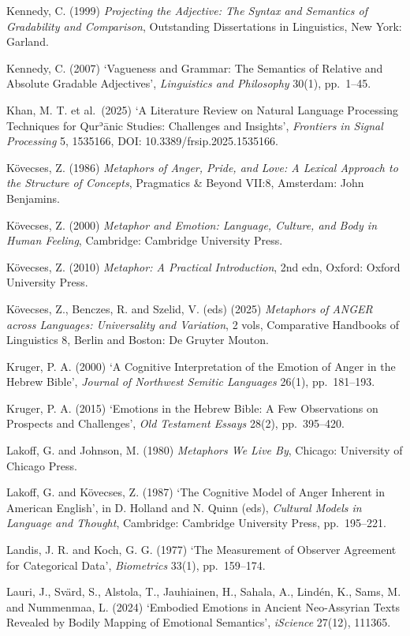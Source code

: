 Kennedy, C. (1999) \emph{Projecting the Adjective: The Syntax and
Semantics of Gradability and Comparison}, Outstanding Dissertations in
Linguistics, New York: Garland.

Kennedy, C. (2007) `Vagueness and Grammar: The Semantics of Relative and
Absolute Gradable Adjectives', \emph{Linguistics and Philosophy} 30(1),
pp.~1--45.

Khan, M. T. et al.~(2025) `A Literature Review on Natural Language
Processing Techniques for Qurʾānic Studies: Challenges and Insights',
\emph{Frontiers in Signal Processing} 5, 1535166, DOI:
10.3389/frsip.2025.1535166.

Kövecses, Z. (1986) \emph{Metaphors of Anger, Pride, and Love: A Lexical
Approach to the Structure of Concepts}, Pragmatics \& Beyond VII:8,
Amsterdam: John Benjamins.

Kövecses, Z. (2000) \emph{Metaphor and Emotion: Language, Culture, and
Body in Human Feeling}, Cambridge: Cambridge University Press.

Kövecses, Z. (2010) \emph{Metaphor: A Practical Introduction}, 2nd edn,
Oxford: Oxford University Press.

Kövecses, Z., Benczes, R. and Szelid, V. (eds) (2025) \emph{Metaphors of
ANGER across Languages: Universality and Variation}, 2 vols, Comparative
Handbooks of Linguistics 8, Berlin and Boston: De Gruyter Mouton.

Kruger, P. A. (2000) `A Cognitive Interpretation of the Emotion of Anger
in the Hebrew Bible', \emph{Journal of Northwest Semitic Languages}
26(1), pp.~181--193.

Kruger, P. A. (2015) `Emotions in the Hebrew Bible: A Few Observations
on Prospects and Challenges', \emph{Old Testament Essays} 28(2),
pp.~395--420.

Lakoff, G. and Johnson, M. (1980) \emph{Metaphors We Live By}, Chicago:
University of Chicago Press.

Lakoff, G. and Kövecses, Z. (1987) `The Cognitive Model of Anger
Inherent in American English', in D. Holland and N. Quinn (eds),
\emph{Cultural Models in Language and Thought}, Cambridge: Cambridge
University Press, pp.~195--221.

Landis, J. R. and Koch, G. G. (1977) `The Measurement of Observer
Agreement for Categorical Data', \emph{Biometrics} 33(1), pp.~159--174.

Lauri, J., Svärd, S., Alstola, T., Jauhiainen, H., Sahala, A., Lindén,
K., Sams, M. and Nummenmaa, L. (2024) `Embodied Emotions in Ancient
Neo-Assyrian Texts Revealed by Bodily Mapping of Emotional Semantics',
\emph{iScience} 27(12), 111365.


